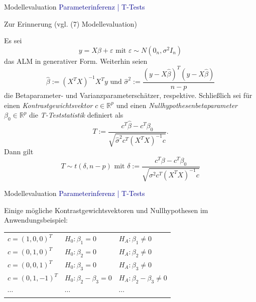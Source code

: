 \documentclass[
  8pt,
  ignorenonframetext,
]{beamer}
\begin{document}
\begin{frame}{Modellevaluation}
\protect\hypertarget{modellevaluation}{}
\textcolor{darkblue}{Parameterinferenz | T-Tests}

\small

Zur Erinnerung (vgl. (7) Modellevaluation)

\vspace{1mm}
\footnotesize
\begin{theorem}[T-Teststatistik]
\normalfont
\justifying
Es sei
\begin{equation}
y = X\beta + \varepsilon \mbox{ mit } \varepsilon \sim N(0_n,\sigma^2I_n)
\end{equation}
das ALM in generativer Form. Weiterhin seien
\begin{equation}
\hat{\beta} := (X^TX)^{-1}X^Ty \mbox{ und } \hat{\sigma}^2 := \frac{(y - X\hat{\beta})^T(y - X\hat{\beta})}{n-p}
\end{equation}
die Betaparameter- und Varianzparameterschätzer, respektive. Schließlich sei für
einen \textit{Kontrastgewichtsvektor} $c \in \mathbb{R}^p$ und
einen \textit{Nullhypothesenbetaparameter} $\beta_0 \in \mathbb{R}^p$
die \textit{T-Teststatistik} definiert als
\begin{equation}
T := \frac{c^T\hat{\beta} - c^T\beta_0}{\sqrt{\hat{\sigma}^2 c^T(X^TX)^{-1}c}}.
\end{equation}
Dann gilt
\begin{equation}
T \sim t(\delta, n-p) \mbox{ mit } \delta := \frac{c^T\beta - c^T\beta_0}{\sqrt{\sigma^2 c^T(X^TX)^{-1}c}}
\end{equation}
\end{theorem}
\end{frame}

\begin{frame}{Modellevaluation}
\protect\hypertarget{modellevaluation-1}{}
\textcolor{darkblue}{Parameterinferenz | T-Tests}

\small

Einige mögliche Kontrastgewichtsvektoren und Nullhypothesen im
Anwendungsbeispiel:

\vspace{2mm}
\center
\renewcommand{\arraystretch}{3}
\begin{tabular}{lll}
$c = (1,0,0)^T$  & $H_0 : \beta_1 = 0$           & $H_A:\beta_1 \neq 0$          \\
$c = (0,1,0)^T$  & $H_0 : \beta_2 = 0$           & $H_A:\beta_2 \neq 0$          \\
$c = (0,0,1)^T$  & $H_0 : \beta_3 = 0$           & $H_A:\beta_3 \neq 0$          \\
$c = (0,1,-1)^T$ & $H_0 : \beta_2 - \beta_3 = 0$ & $H_A:\beta_2-\beta_3\neq 0$   \\
$\cdots$         & $\cdots$                      & $\cdots$                      \\
\end{tabular}
\end{frame}
\end{document}
